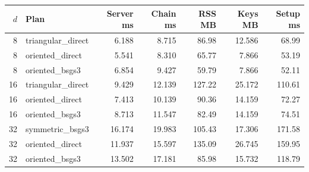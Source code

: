 \begin{tabular}{rlrrrrr}
\toprule
$d$ & Plan & Server ms & Chain ms & RSS MB & Keys MB & Setup ms \\
\midrule
8 & triangular\_direct & 6.188 & 8.715 & 86.98 & 12.586 & 68.99 \\
8 & oriented\_direct & 5.541 & 8.310 & 65.77 & 7.866 & 53.19 \\
8 & oriented\_bsgs3 & 6.854 & 9.427 & 59.79 & 7.866 & 52.11 \\
16 & triangular\_direct & 9.429 & 12.139 & 127.22 & 25.172 & 110.61 \\
16 & oriented\_direct & 7.413 & 10.139 & 90.36 & 14.159 & 72.27 \\
16 & oriented\_bsgs3 & 8.713 & 11.547 & 82.49 & 14.159 & 74.51 \\
32 & symmetric\_bsgs3 & 16.174 & 19.983 & 105.43 & 17.306 & 171.58 \\
32 & oriented\_direct & 11.937 & 15.597 & 135.09 & 26.745 & 159.95 \\
32 & oriented\_bsgs3 & 13.502 & 17.181 & 85.98 & 15.732 & 118.79 \\
\bottomrule
\end{tabular}
